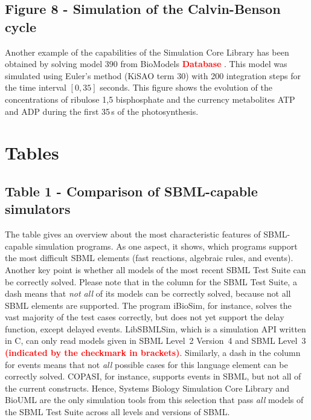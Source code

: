 \documentclass[10pt]{bmc_article}
\newenvironment{bmcformat}{\baselineskip20pt\sloppy\setboolean{publ}{false}}{\baselineskip20pt\sloppy}
\newcommand{\TODO}[1]{\textcolor{red}{\textbf{#1}}}
\begin{document}
\begin{bmcformat}
\subsection*{Figure 8 - Simulation of the Calvin-Benson cycle}
Another example of the capabilities of the Simulation Core Library has been
obtained by solving model 390 from BioModels \TODO{Database} 
\cite{Novere2006a, Arnold2011}.
This model was simulated using Euler's method (KiSAO term 30) with 200
integration steps for the time interval $[0, 35]$ seconds.
This figure shows the evolution of the concentrations of ribulose 1,5
bisphosphate and the currency metabolites ATP and ADP during the first 35\,s of
the photosynthesis.



\section*{Tables}

\subsection*{Table 1 - Comparison of SBML-capable simulators}
The table gives an overview about the most characteristic features of
SBML-capable simulation programs. As one aspect, it shows, which programs
support the most difficult SBML elements (fast reactions, algebraic rules, and
events). Another key point is whether all models of the most recent SBML Test
Suite can be correctly solved.
Please note that in the column for the SBML Test Suite, a dash means that
\emph{not all} of its models can be correctly solved, because not all SBML
elements are supported.
The program iBioSim, for instance, solves the vast majority of the test cases
correctly, but does not yet support the delay function, except delayed events.
LibSBMLSim, which is a simulation API written in C, can only read models given
in SBML Level~2 Version~4 and SBML Level~3
\TODO{(indicated by the checkmark in brackets)}.
Similarly, a dash in the column for events means that not \emph{all} possible
cases for this language element can be correctly solved.
COPASI, for instance, supports events in SBML, but not all of the current 
constructs.
Hence, Systems Biology Simulation Core Library and BioUML are the only
simulation tools from this selection that pass \emph{all} models of the SBML
Test Suite across all levels and versions of SBML.


\end{bmcformat}
\end{document}
